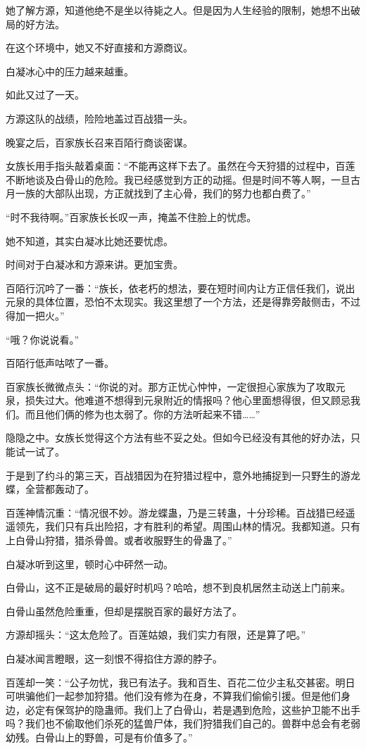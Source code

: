 \begin{this_body}
她了解方源，知道他绝不是坐以待毙之人。但是因为人生经验的限制，她想不出破局的好方法。

在这个环境中，她又不好直接和方源商议。

白凝冰心中的压力越来越重。

如此又过了一天。

方源这队的战绩，险险地盖过百战猎一头。

晚宴之后，百家族长召来百陌行商谈密谋。

女族长用手指头敲着桌面：“不能再这样下去了。虽然在今天狩猎的过程中，百莲不断地谈及白骨山的危险。我已经感觉到方正的动摇。但是时间不等人啊，一旦古月一族的大部队出现，方正就找到了主心骨，我们的努力也都白费了。”

“时不我待啊。”百家族长长叹一声，掩盖不住脸上的忧虑。

她不知道，其实白凝冰比她还要忧虑。

时间对于白凝冰和方源来讲。更加宝贵。

百陌行沉吟了一番：“族长，依老朽的想法，要在短时间内让方正信任我们，说出元泉的具体位置，恐怕不太现实。我这里想了一个方法，还是得靠旁敲侧击，不过得加一把火。”

“哦？你说说看。”

百陌行低声咕哝了一番。

百家族长微微点头：“你说的对。那方正忧心忡忡，一定很担心家族为了攻取元泉，损失过大。他难道不想得到元泉附近的情报吗？他心里面想得很，但又顾忌我们。而且他们俩的修为也太弱了。你的方法听起来不错……”

隐隐之中。女族长觉得这个方法有些不妥之处。但如今已经没有其他的好办法，只能试一试了。

于是到了约斗的第三天，百战猎因为在狩猎过程中，意外地捕捉到一只野生的游龙蝶，全营都轰动了。

百莲神情沉重：“情况很不妙。游龙蝶蛊，乃是三转蛊，十分珍稀。百战猎已经遥遥领先，我们只有兵出险招，才有胜利的希望。周围山林的情况。我都知道。只有上白骨山狩猎，猎杀骨兽。或者收服野生的骨蛊了。”

白凝冰听到这里，顿时心中砰然一动。

白骨山，这不正是破局的最好时机吗？哈哈，想不到良机居然主动送上门前来。

白骨山虽然危险重重，但却是摆脱百家的最好方法了。

方源却摇头：“这太危险了。百莲姑娘，我们实力有限，还是算了吧。”

白凝冰闻言瞪眼，这一刻恨不得掐住方源的脖子。

百莲却一笑：“公子勿忧，我已有法子。我和百生、百花二位少主私交甚密。明日可哄骗他们一起参加狩猎。他们没有修为在身，不算我们偷偷引援。但是他们身边，必定有保驾护的隐蛊师。我们上了白骨山，若是遇到危险，这些护卫能不出手吗？我们也不偷取他们杀死的猛兽尸体，我们狩猎我们自己的。兽群中总会有老弱幼残。白骨山上的野兽，可是有价值多了。”


\end{this_body}
